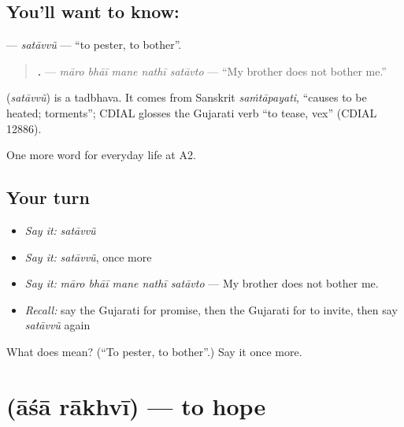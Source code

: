 \subsection*{You'll want to know: }
\textbf{} — \emph{satāvvũ} — \textquotedblleft{}to pester, to bother\textquotedblright{}.

\begin{quote}
\textbf{    .} — \emph{māro bhāī mane nathī satāvto} — \textquotedblleft{}My brother does not bother me.\textquotedblright{}
\end{quote}

\begin{cousinweb}
\textbf{} (\emph{satāvvũ}) is a tadbhava. It comes from Sanskrit \emph{saṁtāpayati}, \textquotedblleft{}causes to be heated; torments\textquotedblright{}; CDIAL glosses the Gujarati verb \textquotedblleft{}to tease, vex\textquotedblright{} (CDIAL 12886).
\end{cousinweb}

\begin{grammarlens}[title={What you've built}]
One more word for everyday life at A2.
\end{grammarlens}

\subsection*{Your turn}
\begin{itemize}
\raggedright
  \item \emph{Say it:} \emph{satāvvũ}
  \item \emph{Say it:} \emph{satāvvũ}, once more
  \item \emph{Say it:} \emph{māro bhāī mane nathī satāvto} — My brother does not bother me.
  \item \emph{Recall:} say the Gujarati for promise, then the Gujarati for to invite, then say \emph{satāvvũ} again
\end{itemize}

\begin{tcolorbox}[breakable,colback=teal!4,colframe=teal!35!black,title={Before you move on}]
What does  mean? (\textquotedblleft{}To pester, to bother\textquotedblright{}.) Say it once more.
\end{tcolorbox}
\section[\texorpdfstring{\gu{આશા} \gu{રાખવી} (āśā rākhvī)}{આશા રાખવી (āśā rākhvī)}]{  (āśā rākhvī) — to hope}


